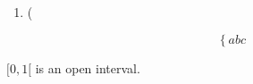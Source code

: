 \documentclass[12pt]{article}
\begin{document}
\begin{enumerate}
  \item (
\end{enumerate}

\begin{equation}
  \left\{abc\right.
\end{equation}

$[0,1[$ is an open interval.
\end{document}
